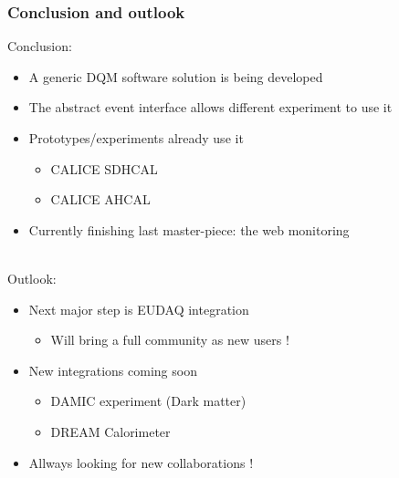 \documentclass[presentation, 10pt]{beamer}
\begin{document}


\begin{frame}
  \frametitle{Conclusion and outlook}
  Conclusion:
  \begin{itemize}
    \footnotesize
    \item A generic DQM software solution is being developed
    \item The abstract event interface allows different experiment to use it
    \item Prototypes/experiments already use it
    \begin{itemize}
      \scriptsize
      \item CALICE SDHCAL
      \item CALICE AHCAL
    \end{itemize}
    \item Currently finishing last master-piece: the web monitoring
  \end{itemize}
  ~ \\
  Outlook:
  \begin{itemize}
    \footnotesize
    \item Next major step is EUDAQ integration
    \begin{itemize}
      \scriptsize
      \item Will bring a full community as new users ! 
    \end{itemize}
    \item New integrations coming soon
    \begin{itemize}
      \scriptsize
      \item DAMIC experiment (Dark matter)
      \item DREAM Calorimeter
    \end{itemize}
    \item Allways looking for new collaborations !
  \end{itemize}
\end{frame}
\end{document}
